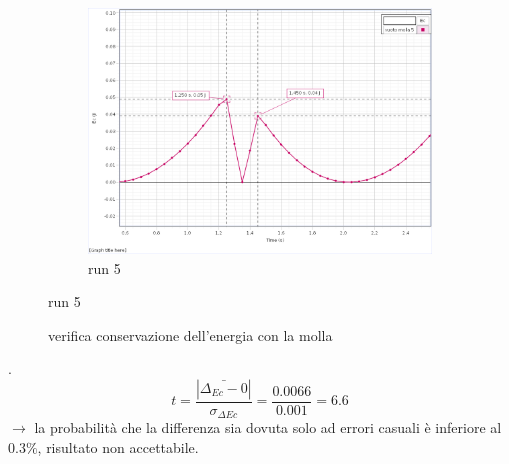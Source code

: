 \documentclass[a4paper]{article}
\theoremstyle{definition}
\begin{document}
\begin{figure}[!htbp]
{{			\begin{subfigure}{2.2\textwidth}
				\caption{run 5}
				\includegraphics[scale=1.15]{capstone_data/Ec_molla_5.png}
			\end{subfigure}%
			
		}
	}
\end{figure}

\begin{figure}[!htbp]
	\captionsetup{labelformat= empty}
	\caption{verifica conservazione dell'energia con la molla}
\end{figure}
.\\
\[t = \frac{ \left |\bar{\Delta_{Ec} - 0} \right |}{\sigma_{\Delta Ec}} = \frac{0.0066}{0.001} = 6.6\]
\noindent \(\rightarrow\) la probabilità che la differenza sia dovuta solo ad errori casuali è inferiore al 0.3\(\%\), risultato non accettabile.\\\\
\end{document}
